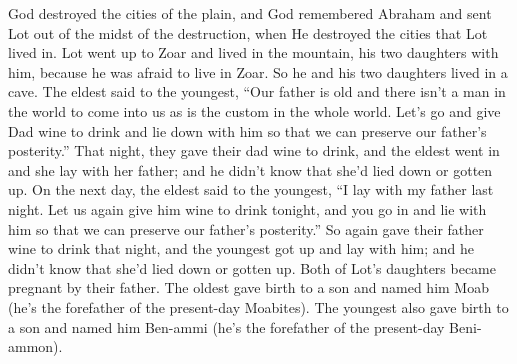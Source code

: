 \begin{inparaenum}
     God destroyed the cities of the plain, and God remembered Abraham and sent Lot out of the midst of the destruction, when He destroyed the cities that Lot lived in.%
     Lot went up to Zoar and lived in the mountain, his two daughters with him, because he was afraid to live in Zoar. So he and his two daughters lived in a cave.%
     The eldest said to the youngest, ``Our father is old and there isn't a man in the world to come into us as is the custom in the whole world.%
     Let's go and give Dad wine to drink and lie down with him so that we can preserve our father's posterity.''%
     That night, they gave their dad wine to drink, and the eldest went in and she lay with her father; and he didn't know that she'd lied down or gotten up.%
     On the next day, the eldest said to the youngest, ``I lay with my father last night. Let us again give him wine to drink tonight, and you go in and lie with him so that we can preserve our father's posterity.''%
     So again gave their father wine to drink that night, and the youngest got up and lay with him; and he didn't know that she'd lied down or gotten up.%
     Both of Lot's daughters became pregnant by their father.%
     The oldest gave birth to a son and named him Moab (he's the forefather of the present-day Moabites).%
     The youngest also gave birth to a son and named him Ben-ammi (he's the forefather of the present-day Beni-ammon).%
\end{inparaenum}
